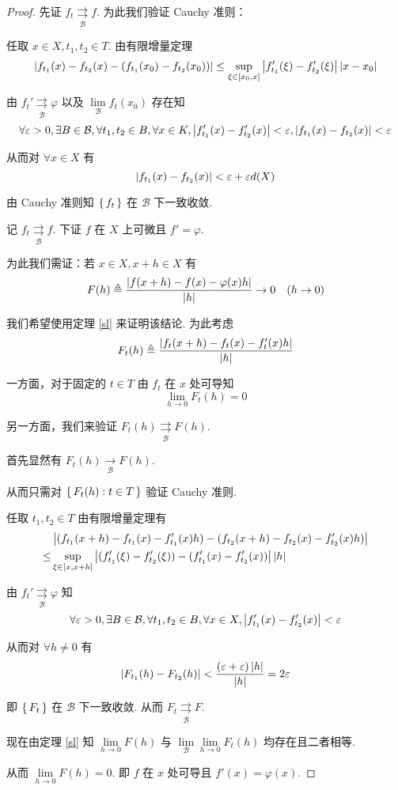 \begin{proof}
    先证 $f_t\underset{\mathcal{B}}{\rightrightarrows}f$. 为此我们验证 Cauchy 准则：

    任取 $x\in X,t_1,t_2\in T$. 由有限增量定理
$$
\left\lvert{f_{t_1}(x)-f_{t_2}(x)-(f_{t_1}(x_0)-f_{t_2}(x_0))}\right\rvert\le\sup_{\xi\in[x_0,x]}\left\lvert{f_{t_1}'(\xi)-f_{t_2}'(\xi)}\right\rvert\left\lvert{x-x_0}\right\rvert
$$

    由 $f_t'\underset{\mathcal{B}}{\rightrightarrows}\varphi$ 以及 $\lim\limits_{\mathcal{B}}f_t(x_0)$ 存在知
$$
\forall\varepsilon>0,\exists B\in\mathcal{B},\forall t_1,t_2\in B,\forall x\in K,\left\lvert{f_{t_1}'(x)-f_{t_2}'(x)}\right\rvert<\varepsilon,\left\lvert{f_{t_1}(x)-f_{t_2}(x)}\right\rvert<\varepsilon
$$

    从而对 $\forall x\in X$ 有
$$
\left\lvert{f_{t_1}(x)-f_{t_2}(x)}\right\rvert<\varepsilon+\varepsilon d(X)
$$

    由 Cauchy 准则知 $\set{f_t}$ 在 $\mathcal{B}$ 下一致收敛.

    记 $f_t\underset{\mathcal{B}}{\rightrightarrows}f$. 下证 $f$ 在 $X$ 上可微且 $f'=\varphi$.

    为此我们需证：若 $x\in X,x+h\in X$ 有
$$
F(h)\triangleq\frac{\left\lvert{f(x+h)-f(x)-\varphi(x)h}\right\rvert}{\left\lvert{h}\right\rvert}\to 0\quad(h\to 0)
$$

    我们希望使用定理 \ref{sl} 来证明该结论. 为此考虑
$$
F_t(h)\triangleq\frac{\left\lvert{f_t(x+h)-f_t(x)-f_t'(x)h}\right\rvert}{\left\lvert{h}\right\rvert}
$$

    一方面，对于固定的 $t\in T$ 由 $f_t$ 在 $x$ 处可导知
$$
\lim_{h\to 0}F_t(h)=0
$$

    另一方面，我们来验证 $F_t(h)\underset{\mathcal{B}}{\rightrightarrows}F(h)$.

    首先显然有 $F_t(h)\xrightarrow[\mathcal{B}]{}F(h)$.

    从而只需对 $\set{F_t(h):t\in T}$ 验证 Cauchy 准则.

    任取 $t_1,t_2\in T$ 由有限增量定理有
$$
\begin{aligned}
    &\left\lvert{(f_{t_1}(x+h)-f_{t_1}(x)-f_{t_1}'(x)h)-(f_{t_2}(x+h)-f_{t_2}(x)-f_{t_2}'(x)h)}\right\rvert\\
    \le&\sup_{\xi\in[x,x+h]}\left\lvert{(f_{t_1}'(\xi)-f_{t_2}'(\xi))-(f_{t_1}'(x)-f_{t_2}'(x))}\right\rvert\left\lvert{h}\right\rvert
\end{aligned}
$$

    由 $f_t'\underset{\mathcal{B}}{\rightrightarrows}\varphi$ 知
$$
\forall\varepsilon>0,\exists B\in\mathcal{B},\forall t_1,t_2\in B,\forall x\in X,\left\lvert{f_{t_1}'(x)-f_{t_2}'(x)}\right\rvert<\varepsilon
$$

    从而对 $\forall h\ne 0$ 有
$$
\left\lvert{F_{t_1}(h)-F_{t_2}(h)}\right\rvert<\frac{(\varepsilon+\varepsilon)\left\lvert{h}\right\rvert}{\left\lvert{h}\right\rvert}=2\varepsilon
$$

    即 $\set{F_t}$ 在 $\mathcal{B}$ 下一致收敛. 从而 $F_t\underset{\mathcal{B}}{\rightrightarrows}F$.

    现在由定理 \ref{sl} 知 $\lim\limits_{h\to 0}F(h)$ 与 $\lim\limits_{\mathcal{B}}\lim\limits_{h\to 0}F_t(h)$ 均存在且二者相等.

    从而 $\lim\limits_{h\to 0}F(h)=0$. 即 $f$ 在 $x$ 处可导且 $f'(x)=\varphi(x)$.
\end{proof}

